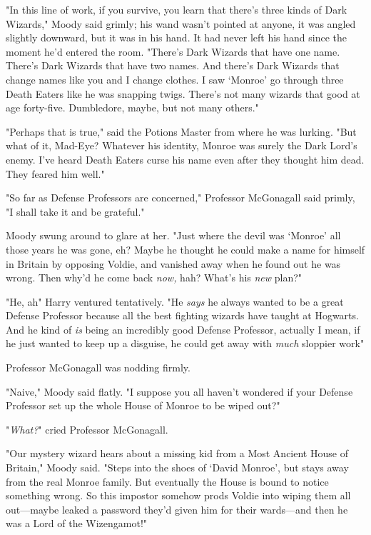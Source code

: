 "In this line of work, if you survive, you learn that there's three kinds of
Dark Wizards," Moody said grimly; his wand wasn't pointed at anyone, it was
angled slightly downward, but it was in his hand. It had never left his hand
since the moment he'd entered the room. "There's Dark Wizards that have one
name. There's Dark Wizards that have two names. And there's Dark Wizards that
change names like you and I change clothes. I saw `Monroe' go through three
Death Eaters like he was snapping twigs. There's not many wizards that good at
age forty-five. Dumbledore, maybe, but not many others."

"Perhaps that is true," said the Potions Master from where he was lurking. "But
what of it, Mad-Eye? Whatever his identity, Monroe was surely the Dark Lord's
enemy. I've heard Death Eaters curse his name even after they thought him dead.
They feared him well."

"So far as Defense Professors are concerned," Professor McGonagall said primly,
"I shall take it and be grateful."

Moody swung around to glare at her. "Just where the devil was `Monroe' all
those years he was gone, eh? Maybe he thought he could make a name for himself
in Britain by opposing Voldie, and vanished away when he found out he was
wrong. Then why'd he come back \emph{now,} hah? What's his \emph{new} plan?"

"He, ah{\el}" Harry ventured tentatively. "He \emph{says} he always wanted
to be a great Defense Professor because all the best fighting wizards have
taught at Hogwarts. And he kind of \emph{is} being an incredibly good Defense
Professor, actually{\el} I mean, if he just wanted to keep up a disguise, he
could get away with \emph{much} sloppier work{\el}"

Professor McGonagall was nodding firmly.

"Naive," Moody said flatly. "I suppose you all haven't wondered if your Defense
Professor set up the whole House of Monroe to be wiped out?"

"\emph{What?}" cried Professor McGonagall.

"Our mystery wizard hears about a missing kid from a Most Ancient House of
Britain," Moody said. "Steps into the shoes of `David Monroe', but stays away
from the real Monroe family. But eventually the House is bound to notice
something wrong. So this impostor somehow prods Voldie into wiping them all
out---maybe leaked a password they'd given him for their wards---and then he
was a Lord of the Wizengamot!"

